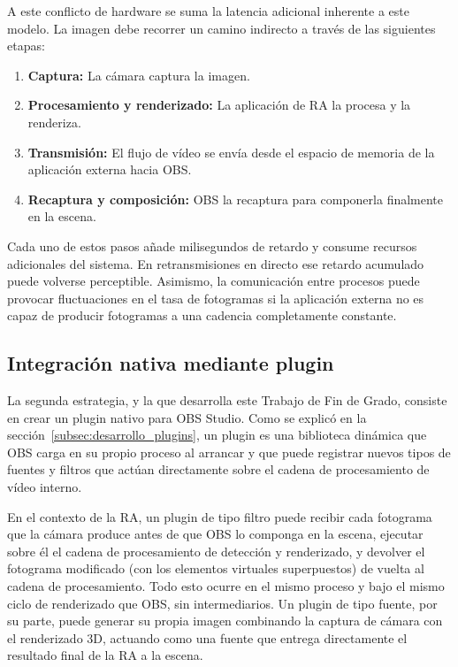 A este conflicto de hardware se suma la latencia adicional inherente a este modelo. La imagen debe recorrer un camino indirecto a través de las siguientes etapas:
\begin{enumerate}
\item \textbf{Captura:} La cámara captura la imagen.
\item \textbf{Procesamiento y renderizado:} La aplicación de RA la procesa y la renderiza.
\item \textbf{Transmisión:} El flujo de vídeo se envía desde el espacio de memoria de la aplicación externa hacia OBS.
\item \textbf{Recaptura y composición:} OBS la recaptura para componerla finalmente en la escena.
\end{enumerate}
Cada uno de estos pasos añade milisegundos de retardo y consume recursos adicionales del sistema. En retransmisiones en directo ese retardo acumulado puede volverse perceptible. Asimismo, la comunicación entre procesos puede provocar fluctuaciones en el tasa de fotogramas si la aplicación externa no es capaz de producir fotogramas a una cadencia completamente constante.




\subsection{Integración nativa mediante plugin}\label{subsec:plugin_nativo}

La segunda estrategia, y la que desarrolla este Trabajo de Fin de Grado, consiste en crear un plugin nativo para OBS Studio. Como se explicó en la sección~\ref{subsec:desarrollo_plugins}, un plugin es una biblioteca dinámica que OBS carga en su propio proceso al arrancar y que puede registrar nuevos tipos de fuentes y filtros que actúan directamente sobre el cadena de procesamiento de vídeo interno.

En el contexto de la RA, un plugin de tipo filtro puede recibir cada fotograma que la cámara produce antes de que OBS lo componga en la escena, ejecutar sobre él el cadena de procesamiento de detección y renderizado, y devolver el fotograma modificado (con los elementos virtuales superpuestos) de vuelta al cadena de procesamiento. Todo esto ocurre en el mismo proceso y bajo el mismo ciclo de renderizado que OBS, sin intermediarios. Un plugin de tipo fuente, por su parte, puede generar su propia imagen combinando la captura de cámara con el renderizado 3D, actuando como una fuente que entrega directamente el resultado final de la RA a la escena.

